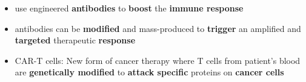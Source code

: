\begin{itemize}
    \item use engineered \textbf{antibodies} to \textbf{boost} the \textbf{immune response}
    \item antibodies can be \textbf{modified} and mass-produced to \textbf{trigger} an amplified and \textbf{targeted} therapeutic \textbf{response}
    \item CAR-T cells: New form of cancer therapy where T cells from patient’s blood are \textbf{genetically modified} to \textbf{attack specific} proteins on \textbf{cancer cells}
\end{itemize}
